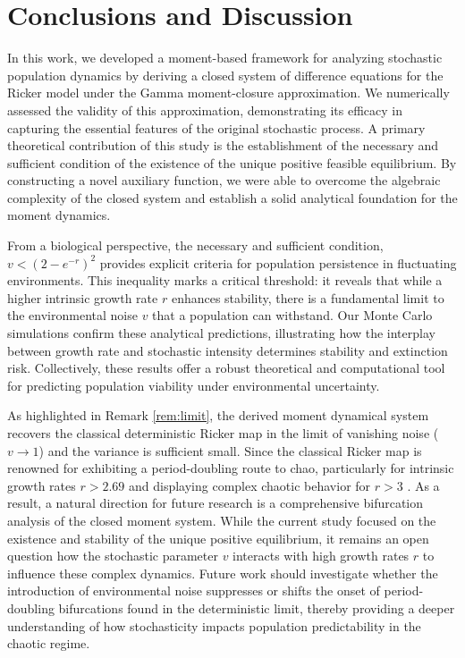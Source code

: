 \documentclass[12pt]{article}
\theoremstyle{definition}
\begin{document}
\section{Conclusions and Discussion}\label{discuss}

In this work, we developed a moment-based framework for analyzing stochastic population dynamics by deriving a closed system of difference equations for the Ricker model under the Gamma moment-closure approximation. We numerically assessed the validity of this approximation, demonstrating its efficacy in capturing the essential features of the original stochastic process. A primary theoretical contribution of this study is the establishment of the necessary and sufficient condition of the existence of the unique positive feasible equilibrium. By constructing a novel auxiliary function, we were able to overcome the algebraic complexity of the closed system and establish a solid analytical foundation for the moment dynamics.

From a biological perspective, the necessary and  sufficient condition, $v < (2 - e^{-r})^2$ provides explicit criteria for population persistence in fluctuating environments. This inequality marks a critical threshold: it reveals that while a higher intrinsic growth rate $r$ enhances stability, there is a fundamental limit to the environmental noise $v$ that a population can withstand. Our Monte Carlo simulations confirm these analytical predictions, illustrating how the interplay between growth rate and stochastic intensity determines stability and extinction risk. Collectively, these results offer a robust theoretical and computational tool for predicting population viability under environmental uncertainty.

As highlighted in Remark \ref{rem:limit}, the derived moment dynamical system recovers the classical deterministic Ricker map in the limit of vanishing noise ($v \to 1$) and the variance is sufficient small. Since the classical Ricker map is renowned for exhibiting a period-doubling route to chao, particularly for intrinsic growth rates $r > 2.69$ and displaying complex chaotic behavior for $r > 3$ \cite{may1976simple}. As a result, a natural direction for future research is a comprehensive bifurcation analysis of the closed moment system. While the current study focused on the existence and stability of the unique positive equilibrium, it remains an open question how the stochastic parameter $v$ interacts with high growth rates $r$ to influence these complex dynamics. Future work should investigate whether the introduction of environmental noise suppresses or shifts the onset of period-doubling bifurcations found in the deterministic limit, thereby providing a deeper understanding of how stochasticity impacts population predictability in the chaotic regime.
\end{document}
